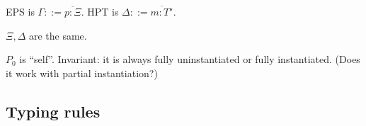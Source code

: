EPS is $\Gamma ::= \overline{p : \Xi}$. HPT is $\Delta ::= \overline{m : T^s}$.

$\Xi, \Delta$ are the same.

$P_0$ is ``self''.  Invariant: it is always fully uninstantiated or fully instantiated. (Does it work with partial instantiation?)

\subsection{Typing rules}





\newpage








